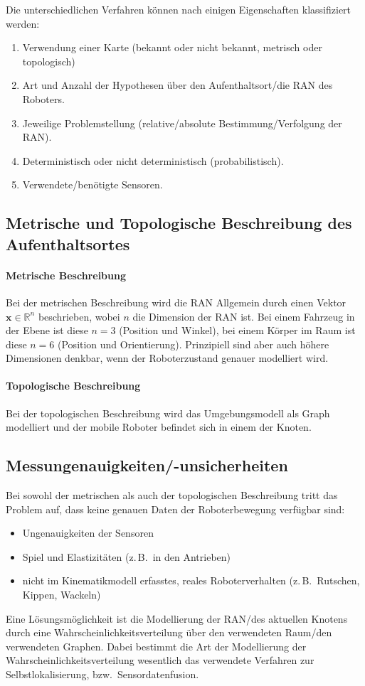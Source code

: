 \documentclass[a4paper, 11pt, accentcolor = tud3b]{tudreport}
\newcommand{\R}{\mathbb{R}}
\renewcommand{\vec}[1]{\boldsymbol{#1}}
\newcommand{\bzw}{bzw.~}
\newcommand{\zB}{z.\,B.~}
\begin{document}
			Die unterschiedlichen Verfahren können nach einigen Eigenschaften klassifiziert werden:
			\begin{enumerate}
				\item Verwendung einer Karte (bekannt oder nicht bekannt, metrisch oder topologisch)
				\item Art und Anzahl der Hypothesen über den Aufenthaltsort/die RAN des Roboters.
				\item Jeweilige Problemstellung (relative/absolute Bestimmung/Verfolgung der RAN).
				\item Deterministisch oder nicht deterministisch (probabilistisch).
				\item Verwendete/benötigte Sensoren.
			\end{enumerate}
		
			\subsection{Metrische und Topologische Beschreibung des Aufenthaltsortes}
				\paragraph{Metrische Beschreibung}
					Bei der metrischen Beschreibung wird die RAN Allgemein durch einen Vektor \( \vec{x} \in \R^n \) beschrieben, wobei \(n\) die Dimension der RAN ist. Bei einem Fahrzeug in der Ebene ist diese \( n = 3 \) (Position und Winkel), bei einem Körper im Raum ist diese \( n = 6 \) (Position und Orientierung). Prinzipiell sind aber auch höhere Dimensionen denkbar, wenn der Roboterzustand genauer modelliert wird.
				
				\paragraph{Topologische Beschreibung}
					Bei der topologischen Beschreibung wird das Umgebungsmodell als Graph modelliert und der mobile Roboter befindet sich in einem der Knoten.
			
			\subsection{Messungenauigkeiten/-unsicherheiten}
				Bei sowohl der metrischen als auch der topologischen Beschreibung tritt das Problem auf, dass keine genauen Daten der Roboterbewegung verfügbar sind:
				\begin{itemize}
					\item Ungenauigkeiten der Sensoren
					\item Spiel und Elastizitäten (\zB in den Antrieben)
					\item nicht im Kinematikmodell erfasstes, reales Roboterverhalten (\zB Rutschen, Kippen, Wackeln)
				\end{itemize}
				Eine Lösungsmöglichkeit ist die Modellierung der RAN/des aktuellen Knotens durch eine Wahrscheinlichkeitsverteilung über den verwendeten Raum/den verwendeten Graphen. Dabei bestimmt die Art der Modellierung der Wahrscheinlichkeitsverteilung wesentlich das verwendete Verfahren zur Selbstlokalisierung, \bzw Sensordatenfusion.
\end{document}
